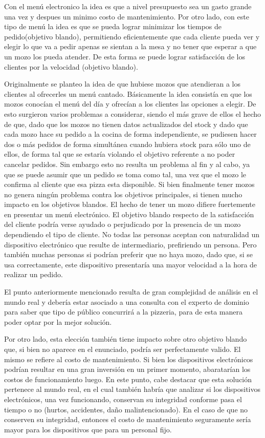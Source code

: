 \documentclass[a4paper,10pt]{article}
\begin{document}
Con el men\'u electronico la idea es que a nivel presupuesto sea un gasto grande una vez y despues un minimo costo de mantenimiento. 
Por otro lado, con este tipo de men\'u la idea es que se pueda lograr minimizar los tiempos de pedido(objetivo blando), 
permitiendo eficientemente que cada cliente pueda ver y elegir lo que va a pedir apenas se sientan a la mesa y no tener que esperar a 
que un mozo los pueda atender. De esta forma se puede lograr satisfacci\'on de los clientes por la velocidad (objetivo blando). 


Originalmente se planteo la idea de que hubiese mozos que atendieran a los clientes al ofrecerles un menú cantado.
 Básicamente la idea consistía en que los mozos conocían el menú del día y ofrecían a los clientes las opciones a elegir.
 De esto surgieron varios problemas a considerar, siendo el más grave de ellos el hecho de que, dado que los mozos no tienen datos
 actualizados del stock y dado que cada mozo hace su pedido a la cocina de forma independiente, se pudiesen hacer dos o más pedidos de
 forma simultánea cuando hubiera stock para sólo uno de ellos, de forma tal que se estaría violando el objetivo referente a no poder 
cancelar pedidos. Sin embargo esto no resulta un problema al fin y al cabo, ya que se puede asumir que un pedido se toma como tal, una vez
que el mozo le confirma al cliente que esa pizza esta disponible. Si bien finalmente tener mozos no genera ning\'un problema contra los objetivos
principales, si tienen mucho impacto en los objetivos blandos. El hecho de tener un mozo difiere fuertemente en presentar un men\'u electr\'onico.
El objetivo blando respecto de la satisfacci\'on del cliente podr\'ia verse ayudado o perjudicado por la presencia de un mozo dependiendo el
tipo de cliente. No todas las personas aceptan con naturalidad un dispositivo electr\'onico que resulte de intermediario, prefiriendo un persona. Pero
tambi\'en muchas personas si podr\'ian preferir que no haya mozo, dado que, si se usa correctamente, este dispositivo presentar\'ia una mayor velocidad
a la hora de realizar un pedido.

El punto anteriormente mencionado resulta de gran complejidad de an\'alisis en el mundo real y deber\'ia estar asociado a una consulta con el
experto de dominio para saber que tipo de p\'ublico concurrir\'a a la pizzeria, para de esta manera poder optar por la mejor soluci\'on.

Por otro lado, esta elecci\'on tambi\'en tiene impacto sobre otro objetivo blando que, si bien no aparece en el enunciado, podr\'ia ser perfectamente valido.
El mismo se refiere al costo de mantenimiento. Si bien los dispositivos electr\'onicos podr\'ian resultar en una gran inversi\'on en un primer momento,
abaratar\'ian los costos de funcionamiento luego. En este punto, cabe destacar que esta soluci\'on pertenece al mundo real, en el cual tambi\'en
habr\'ia que analizar si los dispositivos electr\'onicos, una vez funcionando, conservan su integridad conforme pasa el tiempo o no (hurtos, accidentes, da\~{n}o malintencionado).
En el caso de que no conserven su integridad, entonces el costo de mantenimiento seguramente ser\'ia mayor para los dispositivos que para un personal fijo.
\end{document}

